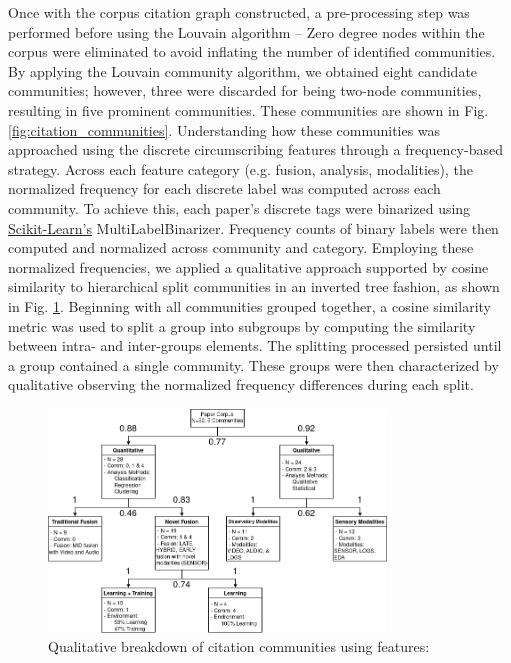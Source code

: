 \documentclass[manuscript,screen,review]{acmart}
\begin{document}
Once with the corpus citation graph constructed, a pre-processing step was performed before using the Louvain algorithm -- Zero degree nodes within the corpus were eliminated to avoid inflating the number of identified communities. By applying the Louvain community algorithm, we obtained eight candidate communities; however, three were discarded for being two-node communities, resulting in five prominent communities. These communities are shown in Fig. \ref{fig:citation_communities}. Understanding how these communities was approached using the discrete circumscribing features through a frequency-based strategy. Across each feature category (e.g. fusion, analysis, modalities), the normalized frequency for each discrete label was computed across each community. To achieve this, each paper's discrete tags were binarized using \href{https://scikit-learn.org/stable/index.html}{Scikit-Learn's} MultiLabelBinarizer. Frequency counts of binary labels were then computed and normalized across community and category. Employing these normalized frequencies, we applied a qualitative approach supported by cosine similarity to hierarchical split communities in an inverted tree fashion, as shown in Fig. \ref{fig:qualitative_breakdown}. Beginning with all communities grouped together, a cosine similarity metric was used to split a group into subgroups by computing the similarity between intra- and inter-groups elements. The splitting processed persisted until a group contained a single community. These groups were then characterized by qualitative observing the normalized frequency differences during each split.

\begin{figure}
    \centering
    \includegraphics[width=0.8\textwidth]{img/community_analysis/Community Breakdown-Latest.drawio(1).png}
    \caption{Qualitative breakdown of citation communities using features: }
    \label{fig:qualitative_breakdown}
\end{figure}
\end{document}
